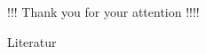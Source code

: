 \documentclass[10pt]{beamer}
\begin{document}
\begin{frame}
    \begin{center}
        !!! Thank you for your attention !!!!
    \end{center}
        
\end{frame}

\begin{frame}{Literatur}
    \printbibliography
\end{frame}
\end{document}
